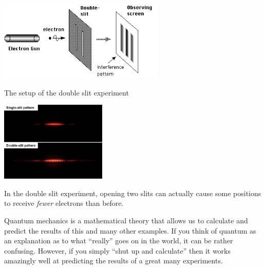\begin{marginfigure}
\centering
\includegraphics[width=\linewidth, height=1.5in, keepaspectratio]{../figure/double-slit-setup.PNG}
\caption{The setup of the double slit experiment}
\label{tmplabelfig}
\end{marginfigure}

\begin{marginfigure}
\centering
\includegraphics[width=\linewidth, height=1.5in, keepaspectratio]{../figure/double_slit2.jpg}
\caption{In the double slit experiment, opening two slits can actually
cause some positions to receive \emph{fewer} electrons than before.}
\label{tmplabelfig}
\end{marginfigure}

Quantum mechanics is a mathematical theory that allows us to calculate
and predict the results of this and many other examples. If you think of
quantum as an explanation as to what ``really'' goes on in the world, it
can be rather confusing. However, if you simply ``shut up and
calculate'' then it works amazingly well at predicting the results of a
great many experiments.

